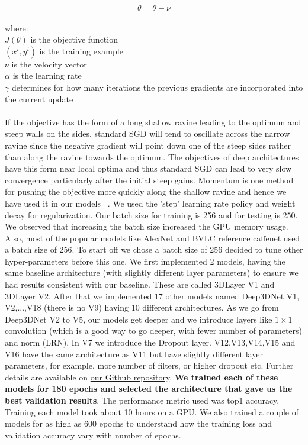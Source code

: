 \documentclass[10pt,twocolumn,letterpaper]{article}
\begin{document}
\begin{equation}
\theta = \theta - \nu
\end{equation}
\\where:
\\$J(\theta)$ is the objective function\\
$(x^{i}, y^{i})$ is the training example\\
$\nu$ is the velocity vector\\
$\alpha$ is the learning rate\\
$\gamma$ determines for how many iterations the previous gradients are incorporated into the current update\\
\\If the objective has the form of a long shallow ravine leading to the optimum and steep walls on the sides, standard SGD will tend to oscillate across the narrow ravine since the negative gradient will point down one of the steep sides rather than along the ravine towards the optimum. The objectives of deep architectures have this form near local optima and thus standard SGD can lead to very slow convergence particularly after the initial steep gains. Momentum is one method for pushing the objective more quickly along the shallow ravine and hence we have used it in our models ~\cite{sgdmom}.
We used the 'step' learning rate policy and weight decay for regularization. Our batch size for training is 256 and for testing is 250. We observed that increasing the batch size increased the GPU memory usage. Also, most of the popular models like AlexNet and BVLC reference caffenet used a batch size of 256. To start off we chose a batch size of 256 decided to tune other hyper-parameters before this one. 
We first implemented 2 models, having the same baseline architecture (with slightly different layer parameters) to ensure we had results consistent with our baseline. These are called 3DLayer V1 and 3DLayer V2. After that we implemented 17 other models named Deep3DNet V1, V2,...,V18 (there is no V9) having 10 different architectures. As we go from Deep3DNet V2 to V5, our models get deeper and we introduce layers like $1 \times 1$ convolution (which is a good way to go deeper, with fewer number of parameters) and norm (LRN). In V7 we introduce the Dropout layer. V12,V13,V14,V15 and V16 have the same architecture as V11 but have slightly different layer parameters, for example, more number of filters, or higher dropout etc. Further details are available on \href{https://github.com/josame/deep3d}{our Github repository}.
\textbf{We trained each of these models for 180 epochs and selected the architecture that gave us the best validation results}. The performance metric used was top1 accuracy. Training each model took about 10 hours on a GPU. We also trained a couple of models for as high as 600 epochs to understand how the training loss and validation accuracy vary with number of epochs.
\end{document}

